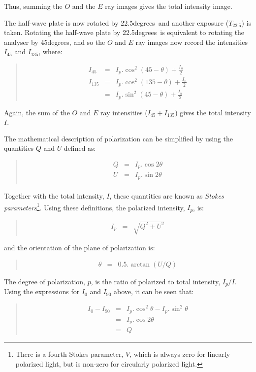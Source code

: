 \documentclass[twoside,11pt]{article}
\renewcommand{\_}{\texttt{\symbol{95}}}
\newenvironment{myquote}{\begin{quote}\begin{small}}{\end{small}\end{quote}}
\newcommand{\dgs}{\hbox{$^\circ$}}
\renewcommand{\dgs}{degrees}
\begin{document}
Thus, summing the $O$ and the $E$ ray images gives the total intensity
image. 

The half-wave plate is now rotated by 22.5\dgs\ and another exposure
($T_{22.5}$) is taken. Rotating the half-wave plate by 22.5\dgs\ is
equivalent to rotating the analyser by 45\dgs, and so the $O$ and $E$ ray
images now record the intensities $I_{45}$ and $I_{135}$, where:
\begin{myquote}
\begin{eqnarray*}
  I_{45} & = & I_{p}.\cos^{2}(45 - \theta) + \frac{I_{u}}{2} \\
 I_{135} & = & I_{p}.\cos^{2}(135 - \theta) + \frac{I_{u}}{2} \\
         & = & I_{p}.\sin^{2}(45 - \theta) + \frac{I_{u}}{2}
\end{eqnarray*}
\end{myquote}

Again, the sum of the $O$ and $E$ ray intensities ($I_{45}+I_{135}$)
gives the total intensity $I$. 

The mathematical description of polarization can be simplified by using 
the quantities $Q$ and $U$ defined as:
\begin{myquote}
\begin{eqnarray*}
  Q & = & I_{p}.\cos 2\theta \\
  U & = & I_{p}.\sin 2\theta \\
\end{eqnarray*}
\end{myquote}

Together with the total intensity, $I$, these quantities are known as 
\emph{Stokes parameters}\footnote{There is a fourth Stokes parameter, $V$, which is
always zero for linearly polarized light, but is non-zero for circularly
polarized light.}. Using these definitions, the polarized intensity, $I_{p}$, 
is:
\begin{myquote}
\begin{eqnarray*}
  I_{p} & = & \sqrt{ Q^{2} + U^{2} }
\end{eqnarray*}
\end{myquote}

and the orientation of the plane of polarization is:
\begin{myquote}
\begin{eqnarray*}
  \theta & = & 0.5.\arctan (U/Q)
\end{eqnarray*}
\end{myquote}

The degree of polarization, $p$, is the ratio of polarized to total
intensity, $I_{p}/I$. Using the expressions for $I_{0}$ and $I_{90}$
above, it can be seen that:
\begin{myquote}
\begin{eqnarray*}
  I_{0} - I_{90} & = & I_{p}.\cos^{2}\theta - I_{p}.\sin^{2}\theta \\
                 & = & I_{p}.\cos 2\theta \\
                 & = & Q
\end{eqnarray*}
\end{myquote}
\end{document}
